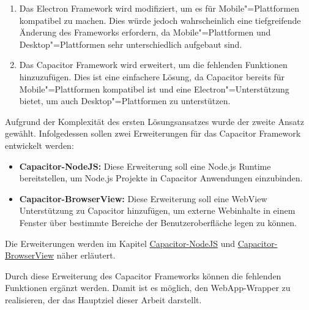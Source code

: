 \begin{enumerate}
  \setlength\itemsep{-0.5em}
  \item
  Das Electron Framework wird modifiziert, um es für Mobile"=Plattformen kompatibel zu machen.
  Dies würde jedoch wahrscheinlich eine tiefgreifende Änderung des Frameworks erfordern, da Mobile"=Plattformen und Desktop"=Plattformen sehr unterschiedlich aufgebaut sind.
  \item
  Das Capacitor Framework wird erweitert, um die fehlenden Funktionen hinzuzufügen.
  Dies ist eine einfachere Lösung, da Capacitor bereits für Mobile"=Plattformen kompatibel ist und eine Electron"=Unterstützung bietet, um auch Desktop"=Plattformen zu unterstützen.
\end{enumerate}

Aufgrund der Komplexität des ersten Lösungsansatzes wurde der zweite Ansatz gewählt.
Infolgedessen sollen zwei Erweiterungen für das Capacitor Framework entwickelt werden:

\begin{itemize}
  \setlength\itemsep{-0.5em}
  \item \textbf{Capacitor-NodeJS:} Diese Erweiterung soll eine Node.js Runtime bereitstellen, um Node.js Projekte in Capacitor Anwendungen einzubinden.
  \item \textbf{Capacitor-BrowserView:} Diese Erweiterung soll eine WebView Unterstützung zu Capacitor hinzufügen, um externe Webinhalte in einem Fenster über bestimmte Bereiche der Benutzeroberfläche legen zu können.
\end{itemize}

Die Erweiterungen werden im Kapitel \hyperref[sec:Capacitor-NodeJS]{Capacitor-NodeJS} und \hyperref[sec:Capacitor-BrowserView]{Capacitor-BrowserView} näher erläutert.

Durch diese Erweiterung des Capacitor Frameworks können die fehlenden Funktionen ergänzt werden.
Damit ist es möglich, den WebApp-Wrapper zu realisieren, der das Hauptziel dieser Arbeit darstellt.
